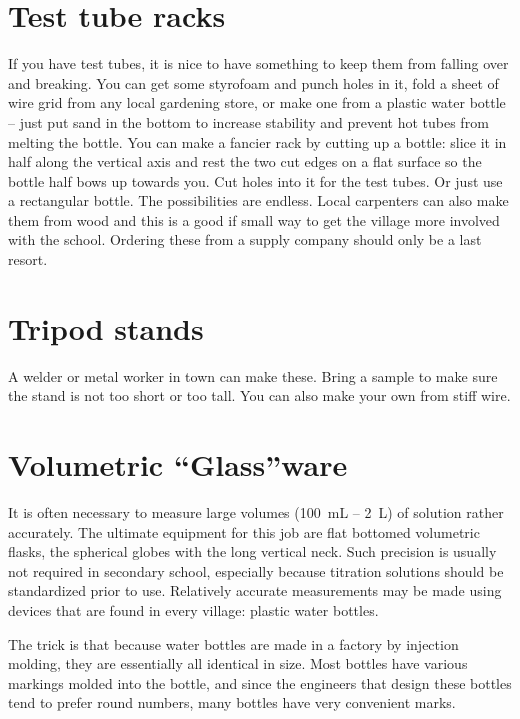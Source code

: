 \section{Test tube racks}
\label{sec:test-tube-racks}
If you have test tubes, 
it is nice to have something to keep them from falling over and breaking. 
You can get some styrofoam and punch holes in it, fold a sheet of wire grid from any local gardening store, 
or make one from a plastic water bottle -- 
just put sand in the bottom to increase stability 
and prevent hot tubes from melting the bottle. 
You can make a fancier rack by cutting up a bottle: 
slice it in half along the vertical axis 
and rest the two cut edges on a flat surface 
so the bottle half bows up towards you. 
Cut holes into it for the test tubes. 
Or just use a rectangular bottle. 
The possibilities are endless. 
Local carpenters can also make them from wood 
and this is a good if small way 
to get the village more involved with the school. 
Ordering these from a supply company should only be a last resort. 

\section{Tripod stands}
\label{sec:tripod-stands}
A welder or metal worker in town can make these. 
Bring a sample to make sure the stand is not too short or too tall. 
You can also make your own from stiff wire.

\section{Volumetric ``Glass''ware}
\label{sec:volumetric-glassware}
It is often necessary to measure large volumes (100~mL -- 2~L) 
of solution rather accurately. 
The ultimate equipment for this job are flat bottomed volumetric flasks, 
the spherical globes with the long vertical neck. 
Such precision is usually not required in secondary school, 
especially because titration solutions should be standardized prior to use. 
Relatively accurate measurements may be made using devices 
that are found in every village: plastic water bottles.

The trick is that because water bottles are made in a factory 
by injection molding, 
they are essentially all identical in size. 
Most bottles have various markings molded into the bottle, 
and since the engineers that design these bottles tend 
to prefer round numbers, 
many bottles have very convenient marks.

